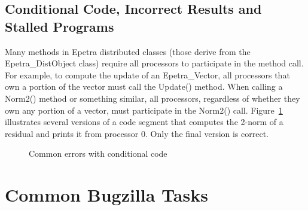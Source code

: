 \documentclass[12pt,relax]{EpetraUserGuide}
\renewcommand{\vector}{Epetra\_Vector}
\newcommand{\distobject}{Epetra\_DistObject}
\begin{document}
\subsection{Conditional Code, Incorrect Results and Stalled Programs}
Many methods in Epetra distributed classes (those derive from the
\distobject{} class) require all processors to
participate in the method call.  For example, to compute the update of
an \vector{}, all processors that own a portion of the vector must
call the Update() method.  When calling a Norm2() method or something
similar, all processors, regardless of whether they own any portion of
a vector, must participate in the Norm2() call.
Figure~\ref{Figure:HungCode} illustrates
several versions of a code segment that computes the 2-norm of a residual
and prints it from processor 0.  Only the final version is correct.
\begin{figure}
\begin{center}

\end{center}
\caption{\label{Figure:HungCode} Common errors with conditional code}
\end{figure}

\section{Common Bugzilla Tasks}
\label{Section:Bugzilla}
\end{document}
